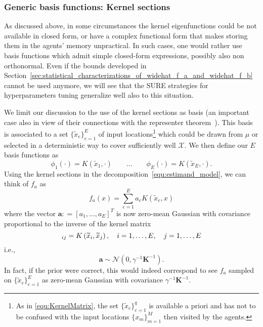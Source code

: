 \documentclass[10pt,twocolumn,twoside]{IEEEtran}					%
\theoremstyle	{plain}
\newcommand{\DefinedAs}			[0]	{\mathrel{\mathop:}=}
\newcommand{\GaussianDistribution}					[2]	{\mathcal{N} \left( #1, #2 \right)}
\newcommand	{\Section}				[0]	{Section}
\begin{document}
\subsubsection{Generic basis functions: Kernel sections}
\label{ssec:using_kernel_sections}

As discussed above, in some circumstances the kernel eigenfunctions could be not available in closed form, or have a complex functional form that makes storing them in the agents' memory unpractical. In such cases, one would rather use basis functions which admit simple closed-form expressions, possibly also non orthonormal. Even if the bounds developed in \Section~\ref{sec:statistical_characterizations_of_widehat_f_a_and_widehat_f_b} cannot be used anymore, we will see that the SURE strategies for hyperparameters tuning generalize well also to this situation.

We limit our discussion to the use of the kernel sections as basis (an important case also in view of their connections with the representer theorem~\cite{Kimeldorf70,Scholkopf01}). This basis is associated to a set $\{\widetilde{x}_{e}\}_{e=1}^E$ of input locations\footnote{As in \eqref{equ:KernelMatrix}, the set $\{\widetilde{x}_{e}\}_{e=1}^q$ is available a priori and has not to be confused with the input locations $\{x_{m}\}_{m=1}^M$ then visited by the agents.} which could be drawn from $\mu$ or selected in a deterministic way to cover sufficiently well $\mathcal{X}$. We then define our $E$ basis functions as
%
\begin{equation}
	\phi_{1}(\cdot)
	=
	K \left( \widetilde{x}_1, \cdot \right)
	\qquad \ldots \qquad
	\phi_{E}(\cdot)
	=
	K \left( \widetilde{x}_E, \cdot \right).
	\label{equ:KernelSections}
\end{equation}
%
Using the kernel sections in the decomposition~\eqref{equ:estimand_model}, we can think of $f_{a}$ as
\begin{equation}
	f_{a}(x) = \sum_{e = 1}^{E} a_{e} K \left( \widetilde{x}_e, x \right)
\end{equation}
where the vector $\bm{a} \DefinedAs \left[ a_{1}, \ldots, a_{E} \right]^{T}$ is now zero-mean Gaussian with covariance proportional to the inverse of the kernel matrix 
%
\begin{equation}
	[\bm{K}]_{ij}
	=
	K \left( \widetilde{x}_i, \widetilde{x}_j \right),
	\quad i=1,\ldots,E, \quad j=1,\ldots,E
	\vspace{0.1cm}
\end{equation}
% 
i.e.,
$$
\bm{a} \sim \GaussianDistribution{0}{\gamma^{-1} \bm{K}^{-1}}.
$$
In fact, if the prior were correct, this would indeed correspond to see $f_{a}$ sampled on $\{\widetilde{x}_{e}\}_{e=1}^E$ as zero-mean Gaussian with covariance $\gamma^{-1} \bm{K}^{-1}$.
\end{document}
